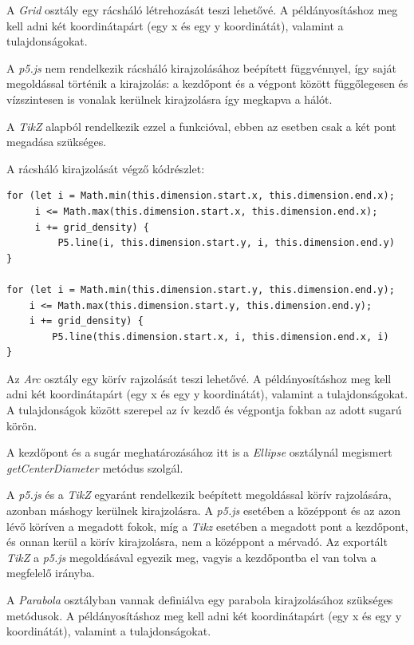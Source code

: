 
A \textit{Grid} osztály egy rácsháló létrehozását teszi lehetővé.  A példányosításhoz meg kell adni két koordinátapárt (egy x és egy y koordinátát), valamint a tulajdonságokat. 

A \textit{p5.js} nem rendelkezik rácsháló kirajzolásához beépített függvénnyel, így saját megoldással történik a kirajzolás: a kezdőpont és a végpont között függőlegesen és vízszintesen is vonalak kerülnek kirajzolásra így megkapva a hálót.

A \textit{TikZ} alapból rendelkezik ezzel a funkcióval, ebben az esetben csak a két pont megadása szükséges.

A rácsháló kirajzolását végző kódrészlet:

\begin{lstlisting}[style=es6]
for (let i = Math.min(this.dimension.start.x, this.dimension.end.x); 
     i <= Math.max(this.dimension.start.x, this.dimension.end.x); 
     i += grid_density) {
         P5.line(i, this.dimension.start.y, i, this.dimension.end.y)
}

for (let i = Math.min(this.dimension.start.y, this.dimension.end.y); 
    i <= Math.max(this.dimension.start.y, this.dimension.end.y); 
    i += grid_density) {
        P5.line(this.dimension.start.x, i, this.dimension.end.x, i)
}
\end{lstlisting}


Az \textit{Arc} osztály egy körív rajzolását teszi lehetővé. A példányosításhoz meg kell adni két koordinátapárt (egy x és egy y koordinátát), valamint a tulajdonságokat. A tulajdonságok között szerepel az ív kezdő és végpontja fokban az adott sugarú körön.

A kezdőpont és a sugár meghatározásához itt is a \textit{Ellipse} osztálynál megismert \textit{getCenterDiameter} metódus szolgál. 

A \textit{p5.js} és a \textit{TikZ} egyaránt rendelkezik beépített megoldással körív rajzolására, azonban máshogy kerülnek kirajzolásra. A \textit{p5.js} esetében a középpont és az azon lévő köríven a megadott fokok, míg a \textit{Tikz} esetében a megadott pont a kezdőpont, és onnan kerül a körív kirajzolásra, nem a középpont a mérvadó. Az exportált \textit{TikZ} a \textit{p5.js} megoldásával egyezik meg, vagyis a kezdőpontba el van tolva a megfelelő irányba.


A \textit{Parabola} osztályban vannak definiálva egy parabola kirajzolásához szükséges metódusok. A példányosításhoz meg kell adni két koordinátapárt (egy x és egy y koordinátát), valamint a tulajdonságokat.

